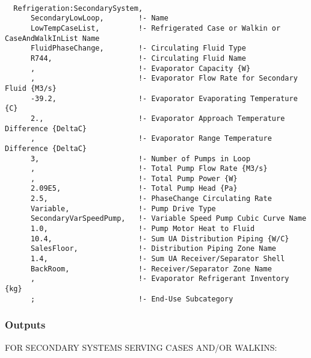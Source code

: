 \begin{lstlisting}

  Refrigeration:SecondarySystem,
      SecondaryLowLoop,        !- Name
      LowTempCaseList,         !- Refrigerated Case or Walkin or CaseAndWalkInList Name
      FluidPhaseChange,        !- Circulating Fluid Type
      R744,                    !- Circulating Fluid Name
      ,                        !- Evaporator Capacity {W}
      ,                        !- Evaporator Flow Rate for Secondary Fluid {M3/s}
      -39.2,                   !- Evaporator Evaporating Temperature {C}
      2.,                      !- Evaporator Approach Temperature Difference {DeltaC}
      ,                        !- Evaporator Range Temperature Difference {DeltaC}
      3,                       !- Number of Pumps in Loop
      ,                        !- Total Pump Flow Rate {M3/s}
      ,                        !- Total Pump Power {W}
      2.09E5,                  !- Total Pump Head {Pa}
      2.5,                     !- PhaseChange Circulating Rate
      Variable,                !- Pump Drive Type
      SecondaryVarSpeedPump,   !- Variable Speed Pump Cubic Curve Name
      1.0,                     !- Pump Motor Heat to Fluid
      10.4,                    !- Sum UA Distribution Piping {W/C}
      SalesFloor,              !- Distribution Piping Zone Name
      1.4,                     !- Sum UA Receiver/Separator Shell
      BackRoom,                !- Receiver/Separator Zone Name
      ,                        !- Evaporator Refrigerant Inventory {kg}
      ;                        !- End-Use Subcategory
\end{lstlisting}

\subsubsection{Outputs}\label{outputs-11-005}

FOR SECONDARY SYSTEMS SERVING CASES AND/OR WALKINS:

